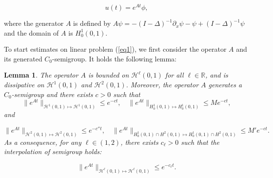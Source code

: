 \documentclass[10pt,a4paper,final]{article}
\numberwithin{equation}{section}
\newtheorem{lemma}[theorem]{Lemma}
\newcommand{\R}{\mathbb{R}}
\newcommand{\cH}{\mathcal{H}}
\begin{document}
\begin{equation*}
 u(t)=e^{At}\phi,    
\end{equation*}

where the generator $A$ is defined by $A\psi=-(I-\Delta)^{-1}\partial_x\psi-\psi+(I-\Delta)^{-1}\psi$ and  the domain of $A$ is $H^1_0(0,1)$.


To start estimates on linear problem (\ref{eq1}), we first consider the operator $A$ and its generated $C_0$-semigroup. It holds the following lemma:

\begin{lemma}
    The operator $A$ is bounded on $\cH^\ell(0,1)$ for all $\ell\in \R$, and is dissipative on $\cH^1(0,1)$ and $\cH^2(0,1)$. Moreover, the operator $A$ generates a $C_0$-semigroup and there exists $c>0$ such that 
    $$\|e^{At}\|_{\cH^1(0,1)\mapsto \cH^1(0,1)}\leq e^{-ct}, \quad \|e^{At}\|_{H^1_0(0,1)\mapsto H^1_0(0,1)}\leq Me^{-ct},$$
  and 
  
    $$ \|e^{At}\|_{\cH^2(0,1)\mapsto \cH^2(0,1)}\leq e^{-c''t}, \quad \|e^{At}\|_{H^1_0(0,1)\cap H^2(0,1)\mapsto H^1_0(0,1)\cap H^2(0,1)}\leq M'e^{-ct}. $$
    As a consequence, for any $\ell\in(1,2)$,  there exists $c_{\ell}>0$ such that the interpolation of semigroup holds:
    
     $$ \|e^{At}\|_{\cH^{\ell}(0,1)\mapsto \cH^{\ell}(0,1)}\leq e^{-c_{\ell}t}. $$
\end{lemma}
\end{document}
